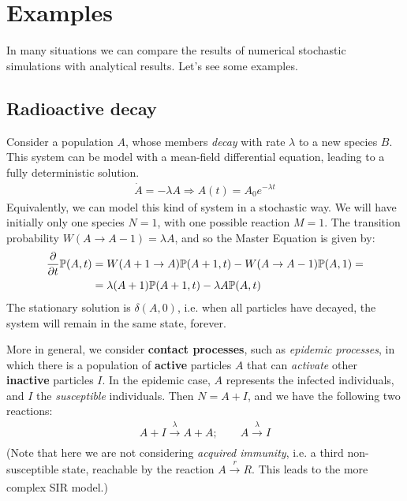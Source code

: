 \documentclass[../template.tex]{subfiles}
\begin{document}
\section{Examples}
In many situations we can compare the results of numerical stochastic simulations with analytical results. Let's see some examples.

\subsection{Radioactive decay}
Consider a population $A$, whose members \textit{decay} with rate $\lambda$ to a new species $B$. This system can be model with a mean-field differential equation, leading to a fully deterministic solution. 
\begin{align*}
    \dot{A} = - \lambda A \Rightarrow A(t) = A_0 e^{-\lambda t}
\end{align*}
Equivalently, we can model this kind of system in a stochastic way. We will have initially only one species $N=1$, with one possible reaction $M = 1$. The transition probability $W(A \to A-1) = \lambda A$, and so the Master Equation is given by:
\begin{align*}
    \pdv{t} \mathbb{P}(A,t) &= W(A+1 \to A) \mathbb{P}(A+1, t) - W(A \to A-1) \mathbb{P}(A,1) =\\
    &= \lambda (A + 1) \mathbb{P}(A+1,t) - \lambda A \mathbb{P}(A,t)
\end{align*}
The stationary solution is $\delta(A, 0)$, i.e. when all particles have decayed, the system will remain in the same state, forever.

\medskip

More in general, we consider \textbf{contact processes}, such as \textit{epidemic processes}, in which there is a population of \textbf{active} particles $A$ that can \textit{activate} other \textbf{inactive} particles $I$. In the epidemic case, $A$ represents the infected individuals, and $I$ the \textit{susceptible} individuals. Then $N = A + I$, and we have the following two reactions:
\begin{align*}
    A + I \xrightarrow[]{\lambda} A + A; \qquad A \xrightarrow[]{\lambda} I
\end{align*}       
(Note that here we are not considering \textit{acquired immunity}, i.e. a third non-susceptible state, reachable by the reaction $A \xrightarrow[]{r} R$. This leads to the more complex SIR model.)
\end{document}
